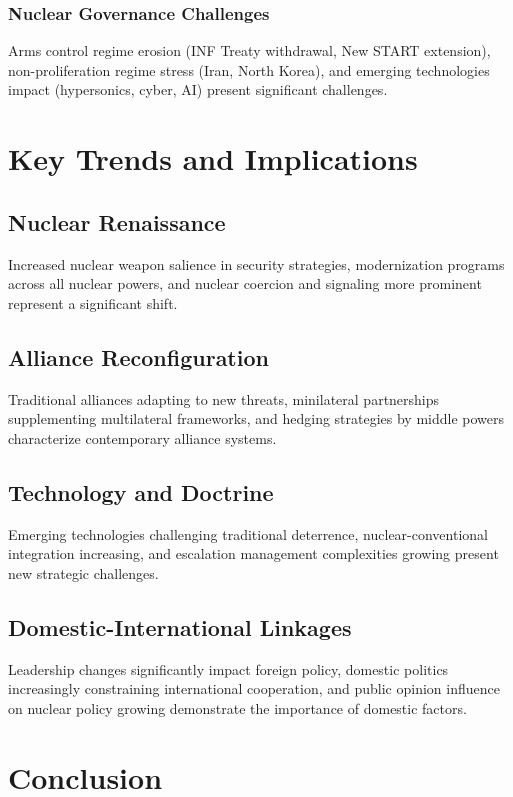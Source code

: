 \documentclass[a4paper, 11pt]{article}
\begin{document}
\subsubsection{Nuclear Governance Challenges}
Arms control regime erosion (INF Treaty withdrawal, New START extension), non-proliferation regime stress (Iran, North Korea), and emerging technologies impact (hypersonics, cyber, AI) present significant challenges.

\section{Key Trends and Implications}

\subsection{Nuclear Renaissance}
Increased nuclear weapon salience in security strategies, modernization programs across all nuclear powers, and nuclear coercion and signaling more prominent represent a significant shift.

\subsection{Alliance Reconfiguration}
Traditional alliances adapting to new threats, minilateral partnerships supplementing multilateral frameworks, and hedging strategies by middle powers characterize contemporary alliance systems.

\subsection{Technology and Doctrine}
Emerging technologies challenging traditional deterrence, nuclear-conventional integration increasing, and escalation management complexities growing present new strategic challenges.

\subsection{Domestic-International Linkages}
Leadership changes significantly impact foreign policy, domestic politics increasingly constraining international cooperation, and public opinion influence on nuclear policy growing demonstrate the importance of domestic factors.

\section{Conclusion}
\end{document}
